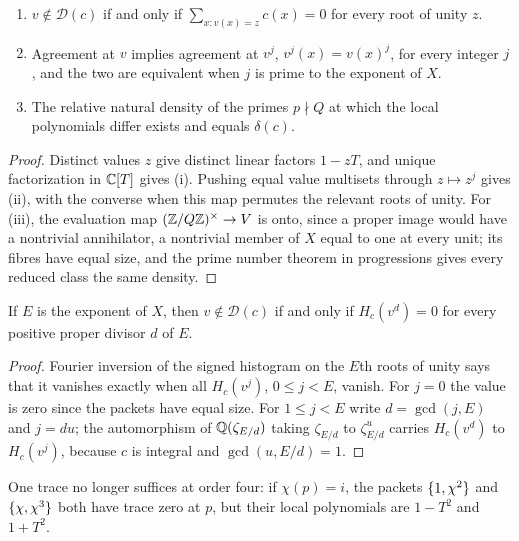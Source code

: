\begin{lemma}\label{rec:lem:chist}
\begin{enumerate}
\item $v\notin\mathcal D(c)$ if and only if $\sum_{x:v(x)=z}c(x)=0$ for every root of unity $z$.
\item Agreement at $v$ implies agreement at $v^j$, $v^j(x)=v(x)^j$, for every integer $j$, and the two are
equivalent when $j$ is prime to the exponent of $X$.
\item The relative natural density of the primes $p\nmid Q$ at which the local polynomials differ exists and
equals $\delta(c)$.
\end{enumerate}
\end{lemma}

\begin{proof}
Distinct values $z$ give distinct linear factors $1-zT$, and unique factorization in $\mathbb{C}[T]$ gives (i).
Pushing equal value multisets through $z\mapsto z^j$ gives (ii), with the converse when this map permutes
the relevant roots of unity. For (iii), the evaluation map $(\mathbb{Z}/Q\mathbb{Z})^\times\to V$ is onto, since a proper
image would have a nontrivial annihilator, a nontrivial member of $X$ equal to one at every unit; its
fibres have equal size, and the prime number theorem in progressions \cite{Davenport2000Multiplicative}
gives every reduced class the same density.
\end{proof}

\begin{proposition}\label{rec:prop:cdivisor}
If $E$ is the exponent of $X$, then $v\notin\mathcal D(c)$ if and only if $H_c(v^d)=0$ for every positive proper divisor
$d$ of $E$.
\end{proposition}

\begin{proof}
Fourier inversion of the signed histogram on the $E$th roots of unity says that it vanishes exactly when
all $H_c(v^j)$, $0\le j<E$, vanish. For $j=0$ the value is zero since the packets have equal size. For
$1\le j<E$ write $d=\gcd(j,E)$ and $j=du$; the automorphism of $\mathbb{Q}(\zeta_{E/d})$ taking $\zeta_{E/d}$ to $\zeta_{E/d}^u$ carries
$H_c(v^d)$ to $H_c(v^j)$, because $c$ is integral and $\gcd(u,E/d)=1$.
\end{proof}

One trace no longer suffices at order four: if $\chi(p)=i$, the packets $\{1,\chi^2\}$ and $\{\chi,\chi^3\}$ both have
trace zero at $p$, but their local polynomials are $1-T^2$ and $1+T^2$.

